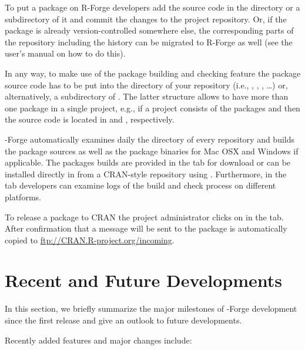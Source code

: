 To put a package on R-Forge developers add the source code in the
 directory or a subdirectory of it and commit the changes to
the project repository. Or, if the package is already
version-controlled somewhere else, the corresponding parts of the
repository including the history can be migrated to R-Forge as well
(see the user's manual on how to do this).

In any way, to make use of the package building and checking feature
the package source code has to be put into the  directory
of your repository (i.e., ,
, , \ldots{}) or, alternatively, a 
subdirectory of . The latter structure allows to
have more than one package in a single project, e.g., if
a project consists of the packages  and  then the
source code is located in  and ,
respectively.

\R{}-Forge automatically examines daily the  directory of
every repository and builds the package sources as well as the package
binaries for Mac OSX and Windows if applicable. The packages builds
are provided in the  tab for download or can be
installed directly in \R{} from a CRAN-style repository using 
. Furthermore, in the  tab developers can examine logs of the build and check
process on different platforms. 

To release a package to CRAN the project administrator clicks on
 in the  tab. After
confirmation that a message will be sent to 
the package is automatically copied to
\url{ftp://CRAN.R-project.org/incoming}.

\section*{Recent and Future Developments}

In this section, we briefly summarize the major milestones of
\R{}-Forge development since the first release and give an outlook to
future developments.

Recently added features and major changes include:

